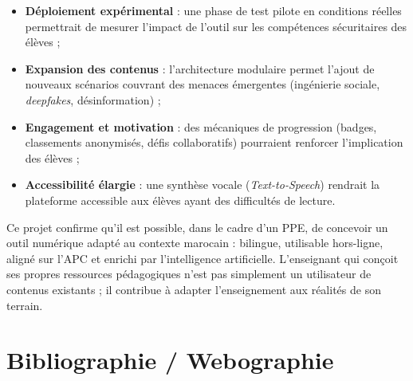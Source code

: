 \documentclass[12pt, a4paper, oneside]{report}
\begin{document}
\begin{itemize}[leftmargin=*]
  \item \textbf{Déploiement expérimental} : une phase de test pilote en conditions réelles permettrait de mesurer l'impact de l'outil sur les compétences sécuritaires des élèves ;
  \item \textbf{Expansion des contenus} : l'architecture modulaire permet l'ajout de nouveaux scénarios couvrant des menaces émergentes (ingénierie sociale, \textit{deepfakes}, désinformation) ;
  \item \textbf{Engagement et motivation} : des mécaniques de progression (badges, classements anonymisés, défis collaboratifs) pourraient renforcer l'implication des élèves ;
  \item \textbf{Accessibilité élargie} : une synthèse vocale (\textit{Text-to-Speech}) rendrait la plateforme accessible aux élèves ayant des difficultés de lecture.
\end{itemize}

Ce projet confirme qu'il est possible, dans le cadre d'un PPE, de concevoir un outil numérique adapté au contexte marocain : bilingue, utilisable hors-ligne, aligné sur l'APC et enrichi par l'intelligence artificielle. L'enseignant qui conçoit ses propres ressources pédagogiques n'est pas simplement un utilisateur de contenus existants ; il contribue à adapter l'enseignement aux réalités de son terrain.

\chapter*{Bibliographie / Webographie}
\end{document}
